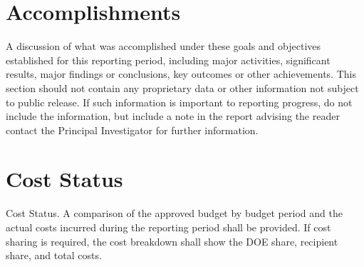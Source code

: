 \documentclass[12pt]{article}
\begin{document}
\section{Accomplishments}
\label{sect::accomplishments}
A discussion of what was accomplished under these goals and objectives established for this reporting period, including major activities, significant results, major findings or conclusions, key outcomes or other achievements.  This section should not contain any proprietary data or other information not subject to public release.  If such information is important to reporting progress, do not include the information, but include a note in the report advising the reader contact the Principal Investigator for further information. 

\section{Cost Status}
\label{sect::cost}
Cost Status.  A comparison of the approved budget by budget period and the actual costs incurred during the reporting period shall be provided.  If cost sharing is required, the cost breakdown shall show the DOE share, recipient share, and total costs. 
\end{document}
